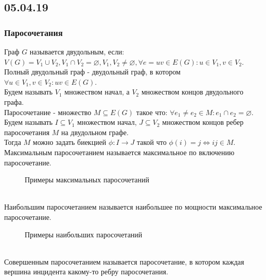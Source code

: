 \subsection{05.04.19}
\subsubsection{Паросочетания}
Граф $G$ называется двудольным, если: $V(G) = V_1 \cup V_2, V_1 \cap V_2 = \varnothing, V_1, V_2 \neq \varnothing, \forall e = uv \in E(G): u \in V_1, v \in V_2$.\\
Полный двудольный граф - двудольный граф, в котором $\forall u \in V_1, v \in V_2: uv \in E(G)$.\\
Будем называть $V_1$ множеством начал, а $V_2$ множеством концов двудольного графа.\\
Паросочетание - множество $M \subseteq E(G)$ такое что: $\forall e_1 \neq e_2 \in M: e_1 \cap e_2 = \varnothing$.\\
Будем называть $I \subseteq V_1$ множеством начал, $J \subseteq V_2$ множеством концов ребер паросочетания $M$ на двудольном графе.\\
Тогда $M$ можно задать биекцией $\phi: I \rightarrow J$ такой что $ \phi(i) = j \Longleftrightarrow ij \in M$.\\
Максимальным паросочетанием называется максимальное по включению паросочетание.\\
\begin{figure}[h]
    \caption{Примеры максимальных паросочетаний}
    \label{fig:Maximal-matching}
\end{figure}\\
Наибольшим паросочетанием называется наибольшее по мощности максимальное паросочетание.\\
\begin{figure}[h]
    \caption{Примеры наибольших паросочетаний}
    \label{fig:Maximum-matching}
\end{figure}\\
Совершенным паросочетанием называется паросочетание, в котором каждая вершина инцидента какому-то ребру паросочетания.\\
